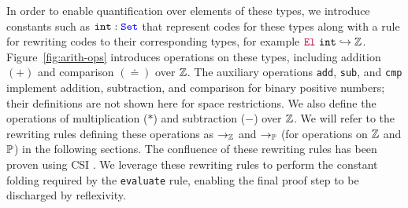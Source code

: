 In order to enable quantification over elements of these types, we introduce constants such as $\texttt{int}: \textcolor{blue}{\texttt{\upshape{Set}}}$ that represent codes for these types along with a rule for rewriting codes to their corresponding types, for example $\textcolor{purple}{\mathop{\texttt{\upshape{El}}}}~\texttt{int} \hookrightarrow \mathbb{Z}$.
Figure~\ref{fig:arith-ops} introduces operations on these types, including addition $(+)$ and comparison $(\doteq)$ over $\mathbb{Z}$. The auxiliary operations \texttt{add}, \texttt{sub}, and \texttt{cmp} implement addition, subtraction, and comparison for binary positive numbers; their definitions are not shown here for space restrictions.
We also define the operations of multiplication ($\mathbin{*}$) and subtraction ($\mathbin{-}$) over $\mathbb{Z}$. 
We will refer to the rewriting rules defining these operations as $\rightarrow_\mathbb{Z}$ and $\rightarrow_\mathbb{P}$ (for operations on $\mathbb{Z}$ and $\mathbb{P}$) in the following sections.
The confluence of these rewriting rules has been proven using CSI \cite{CSI}. %
We leverage these rewriting rules to perform the constant folding required by the \texttt{evaluate} rule, enabling the final proof step to be discharged by reflexivity.

